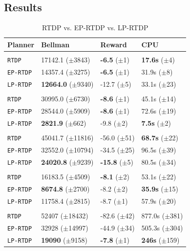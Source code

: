 \documentclass[11pt]{article}
\begin{document}
\subsection{Results}

\begin{table}
\centering
{}
\small
\begin{tabular}{@{}llll@{}}\toprule
Planner & Bellman & Reward & CPU \\ \midrule
&\hspace{-10mm}{\it Mining Task} \\
\texttt{RTDP} & 17142.1 ($\pm$3843) 		& {\bf -6.5} ($\pm$1)  & {\bf 17.6s}   ($\pm$4) \\
\texttt{EP-RTDP} 	& 14357.4 ($\pm$3275) 		& {\bf -6.5}   ($\pm$1) & 31.9s   ($\pm$8) \\
\texttt{LP-RTDP} 	& {\bf 12664.0} ($\pm$9340) 	& -12.7 ($\pm$5) & 33.1s   ($\pm$23) \\\hline
&\hspace{-10mm}{\it Smelting Task} \\
\texttt{RTDP} 	& 30995.0 ($\pm$6730) 		& {\bf -8.6}   ($\pm$1) & 45.1s   ($\pm$14) \\
\texttt{EP-RTDP} 	& 28544.0 ($\pm$5909) 		& {\bf -8.6}   ($\pm$1) & 72.6s   ($\pm$19) \\ 
\texttt{LP-RTDP} 	& {\bf 2821.9} 	 ($\pm$662) 	& -9.8   ($\pm$2) & {\bf 7.5s}  ($\pm$2) \\ \hline
&\hspace{-10mm}{\it Wall Traversal Task} \\
\texttt{RTDP} & 45041.7 ($\pm$11816) 		& -56.0   ($\pm$51) & {\bf 68.7s}   ($\pm$22) \\
\texttt{EP-RTDP} 	& 32552.0 ($\pm$10794) 		& -34.5   ($\pm$25) & 96.5s   ($\pm$39) \\ 
\texttt{LP-RTDP} 	& {\bf 24020.8} ($\pm$9239) 	& {\bf -15.8}   ($\pm$5) & 80.5s   ($\pm$34) \\ \hline
&\hspace{-10mm}{\it Trench Traversal Task} \\
\texttt{RTDP}  	& 16183.5 ($\pm$4509) 		& {\bf -8.1}   ($\pm$2) & 53.1s   ($\pm$22) \\
\texttt{EP-RTDP} 	& {\bf 8674.8} 	($\pm$2700) 	& -8.2   ($\pm$2) & {\bf 35.9s}   ($\pm$15) \\ 
\texttt{LP-RTDP} 	& 11758.4 ($\pm$2815) 		& -8.7   ($\pm$1) & 57.9s   ($\pm$20) \\ \hline
&\hspace{-10mm}{\it Plane Traversal Task} \\
\texttt{RTDP} & 52407 ($\pm$18432) 		& -82.6   ($\pm$42) & 877.0s   ($\pm$381) \\
\texttt{EP-RTDP} 	& 32928 ($\pm$14997) 		& -44.9   ($\pm$34) & 505.3s   ($\pm$304) \\
\texttt{LP-RTDP} 	& {\bf 19090} 	 ($\pm$9158) 	& {\bf-7.8}   ($\pm$1) & {\bf 246s}  ($\pm$159) \\
\bottomrule
\end{tabular}
\caption{RTDP vs. EP-RTDP vs. LP-RTDP}
\label{table:minecraft_results}
\end{table}
\end{document}
